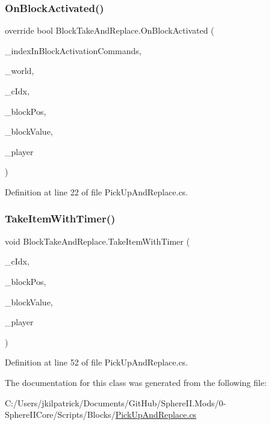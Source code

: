 \mbox{\label{class_block_take_and_replace_af23451b48625362fa68560fed6655440}} 
\subsubsection{\texorpdfstring{OnBlockActivated()}{OnBlockActivated()}}
{\footnotesize\ttfamily override bool Block\+Take\+And\+Replace.\+On\+Block\+Activated (\begin{DoxyParamCaption}\item[{int}]{\+\_\+index\+In\+Block\+Activation\+Commands,  }\item[{World\+Base}]{\+\_\+world,  }\item[{int}]{\+\_\+c\+Idx,  }\item[{Vector3i}]{\+\_\+block\+Pos,  }\item[{Block\+Value}]{\+\_\+block\+Value,  }\item[{Entity\+Alive}]{\+\_\+player }\end{DoxyParamCaption})}



Definition at line 22 of file Pick\+Up\+And\+Replace.\+cs.

\mbox{\label{class_block_take_and_replace_aaf0c8d63af712312d2d0c97fbb94682d}} 
\subsubsection{\texorpdfstring{TakeItemWithTimer()}{TakeItemWithTimer()}}
{\footnotesize\ttfamily void Block\+Take\+And\+Replace.\+Take\+Item\+With\+Timer (\begin{DoxyParamCaption}\item[{int}]{\+\_\+c\+Idx,  }\item[{Vector3i}]{\+\_\+block\+Pos,  }\item[{Block\+Value}]{\+\_\+block\+Value,  }\item[{Entity\+Alive}]{\+\_\+player }\end{DoxyParamCaption})}



Definition at line 52 of file Pick\+Up\+And\+Replace.\+cs.



The documentation for this class was generated from the following file\+:\begin{DoxyCompactItemize}
\item 
C\+:/\+Users/jkilpatrick/\+Documents/\+Git\+Hub/\+Sphere\+I\+I.\+Mods/0-\/\+Sphere\+I\+I\+Core/\+Scripts/\+Blocks/\mbox{\hyperlink{_pick_up_and_replace_8cs}{Pick\+Up\+And\+Replace.\+cs}}\end{DoxyCompactItemize}
